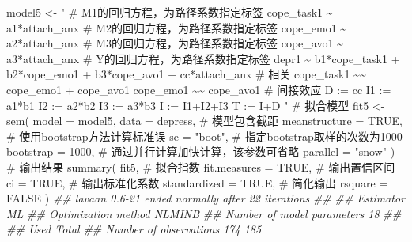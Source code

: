 \documentclass[
  chinese-hans,
  letterpaper,
  DIV=11,
  numbers=noendperiod]{scrartcl}
\newenvironment{Shaded}{\begin{snugshade}}{\end{snugshade}}
\newcommand{\AttributeTok}[1]{\textcolor[rgb]{0.40,0.45,0.13}{#1}}
\newcommand{\CommentTok}[1]{\textcolor[rgb]{0.37,0.37,0.37}{#1}}
\newcommand{\ConstantTok}[1]{\textcolor[rgb]{0.56,0.35,0.01}{#1}}
\newcommand{\DecValTok}[1]{\textcolor[rgb]{0.68,0.00,0.00}{#1}}
\newcommand{\DocumentationTok}[1]{\textcolor[rgb]{0.37,0.37,0.37}{\textit{#1}}}
\newcommand{\FunctionTok}[1]{\textcolor[rgb]{0.28,0.35,0.67}{#1}}
\newcommand{\NormalTok}[1]{\textcolor[rgb]{0.00,0.23,0.31}{#1}}
\newcommand{\OtherTok}[1]{\textcolor[rgb]{0.00,0.23,0.31}{#1}}
\newcommand{\StringTok}[1]{\textcolor[rgb]{0.13,0.47,0.30}{#1}}
\begin{document}
\begin{Shaded}
\begin{Highlighting}[numbers=left,,]
\NormalTok{model5 }\OtherTok{\textless{}{-}} \StringTok{"}
\StringTok{  \# M1的回归方程，为路径系数指定标签}
\StringTok{  cope\_task1 \textasciitilde{} a1*attach\_anx}
\StringTok{  \# M2的回归方程，为路径系数指定标签}
\StringTok{  cope\_emo1 \textasciitilde{} a2*attach\_anx}
\StringTok{  \# M3的回归方程，为路径系数指定标签}
\StringTok{  cope\_avo1 \textasciitilde{} a3*attach\_anx}
\StringTok{  \# Y的回归方程，为路径系数指定标签}
\StringTok{  depr1 \textasciitilde{} b1*cope\_task1 + b2*cope\_emo1 + b3*cope\_avo1 + cc*attach\_anx}
\StringTok{  \# 相关}
\StringTok{  cope\_task1 \textasciitilde{}\textasciitilde{} cope\_emo1 + cope\_avo1}
\StringTok{  cope\_emo1 \textasciitilde{}\textasciitilde{} cope\_avo1}
\StringTok{  \# 间接效应}
\StringTok{  D := cc}
\StringTok{  I1 := a1*b1}
\StringTok{  I2 := a2*b2}
\StringTok{  I3 := a3*b3}
\StringTok{  I := I1+I2+I3}
\StringTok{  T := I+D}
\StringTok{"}
\CommentTok{\# 拟合模型}
\NormalTok{fit5 }\OtherTok{\textless{}{-}} \FunctionTok{sem}\NormalTok{(}
  \AttributeTok{model =}\NormalTok{ model5,}
  \AttributeTok{data =}\NormalTok{ depress,}
  \CommentTok{\# 模型包含截距}
  \AttributeTok{meanstructure =} \ConstantTok{TRUE}\NormalTok{,}
  \CommentTok{\# 使用bootstrap方法计算标准误}
  \AttributeTok{se =} \StringTok{"boot"}\NormalTok{,}
  \CommentTok{\# 指定bootstrap取样的次数为1000}
  \AttributeTok{bootstrap =} \DecValTok{1000}\NormalTok{,}
  \CommentTok{\# 通过并行计算加快计算，该参数可省略}
  \AttributeTok{parallel =} \StringTok{"snow"}
\NormalTok{)}
\CommentTok{\# 输出结果}
\FunctionTok{summary}\NormalTok{(}
\NormalTok{  fit5,}
  \CommentTok{\# 拟合指数}
  \AttributeTok{fit.measures =} \ConstantTok{TRUE}\NormalTok{,}
  \CommentTok{\# 输出置信区间}
  \AttributeTok{ci =} \ConstantTok{TRUE}\NormalTok{,}
  \CommentTok{\# 输出标准化系数}
  \AttributeTok{standardized =} \ConstantTok{TRUE}\NormalTok{,}
  \CommentTok{\# 简化输出}
  \AttributeTok{rsquare =} \ConstantTok{FALSE}
\NormalTok{)}
\DocumentationTok{\#\# lavaan 0.6{-}21 ended normally after 22 iterations}
\DocumentationTok{\#\# }
\DocumentationTok{\#\#   Estimator                                         ML}
\DocumentationTok{\#\#   Optimization method                           NLMINB}
\DocumentationTok{\#\#   Number of model parameters                        18}
\DocumentationTok{\#\# }
\DocumentationTok{\#\#                                                   Used       Total}
\DocumentationTok{\#\#   Number of observations                           174         185}

\end{Highlighting}
\end{Shaded}
\end{document}
